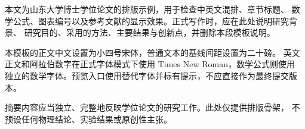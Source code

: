 本文为山东大学博士学位论文的排版示例，用于检查中英文混排、章节标题、
数学公式、图表编号以及参考文献的显示效果。正式写作时，应在此处说明研究背景、
研究目的、采用的方法、主要结果与创新点，并删除本段模板说明。

本模板的正文中文设置为小四号宋体，普通文本的基线间距设置为二十磅。
英文正文和阿拉伯数字在正式字体模式下使用 Times New Roman，数学公式则使用
独立的数学字体。预览入口使用替代字体并标有提示，不应直接作为最终提交版本。

摘要内容应当独立、完整地反映学位论文的研究工作。此处仅提供排版骨架，
不预设任何物理结论、实验结果或原创性主张。
